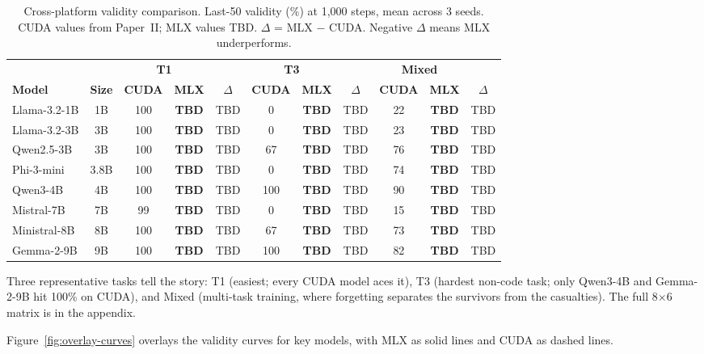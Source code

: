 \documentclass[11pt]{article}
\begin{document}
\begin{table}[t]
\centering
\caption{Cross-platform validity comparison.  Last-50 validity (\%) at 1{,}000 steps, mean across 3 seeds.  CUDA values from Paper~II; MLX values TBD.  $\Delta$ = MLX $-$ CUDA.  Negative $\Delta$ means MLX underperforms.}
\label{tab:cross-platform-validity}
\small
\begin{tabular}{lc cc c cc c cc c}
\toprule
& & \multicolumn{2}{c}{\textbf{T1}} & & \multicolumn{2}{c}{\textbf{T3}} & & \multicolumn{2}{c}{\textbf{Mixed}} & \\
\cmidrule(lr){3-4} \cmidrule(lr){6-7} \cmidrule(lr){9-10}
\textbf{Model} & \textbf{Size} & \textbf{CUDA} & \textbf{MLX} & $\Delta$ & \textbf{CUDA} & \textbf{MLX} & $\Delta$ & \textbf{CUDA} & \textbf{MLX} & $\Delta$ \\
\midrule
Llama-3.2-1B & 1B & 100 & \textbf{TBD} & TBD & 0 & \textbf{TBD} & TBD & 22 & \textbf{TBD} & TBD \\
Llama-3.2-3B & 3B & 100 & \textbf{TBD} & TBD & 0 & \textbf{TBD} & TBD & 23 & \textbf{TBD} & TBD \\
Qwen2.5-3B & 3B & 100 & \textbf{TBD} & TBD & 67 & \textbf{TBD} & TBD & 76 & \textbf{TBD} & TBD \\
Phi-3-mini & 3.8B & 100 & \textbf{TBD} & TBD & 0 & \textbf{TBD} & TBD & 74 & \textbf{TBD} & TBD \\
Qwen3-4B & 4B & 100 & \textbf{TBD} & TBD & 100 & \textbf{TBD} & TBD & 90 & \textbf{TBD} & TBD \\
Mistral-7B & 7B & 99 & \textbf{TBD} & TBD & 0 & \textbf{TBD} & TBD & 15 & \textbf{TBD} & TBD \\
Ministral-8B & 8B & 100 & \textbf{TBD} & TBD & 67 & \textbf{TBD} & TBD & 73 & \textbf{TBD} & TBD \\
Gemma-2-9B & 9B & 100 & \textbf{TBD} & TBD & 100 & \textbf{TBD} & TBD & 82 & \textbf{TBD} & TBD \\
\bottomrule
\end{tabular}
\end{table}

Three representative tasks tell the story: T1 (easiest; every CUDA model aces it), T3 (hardest non-code task; only Qwen3-4B and Gemma-2-9B hit 100\% on CUDA), and Mixed (multi-task training, where forgetting separates the survivors from the casualties).  The full 8$\times$6 matrix is in the appendix.

Figure~\ref{fig:overlay-curves} overlays the validity curves for key models, with MLX as solid lines and CUDA as dashed lines.
\end{document}
